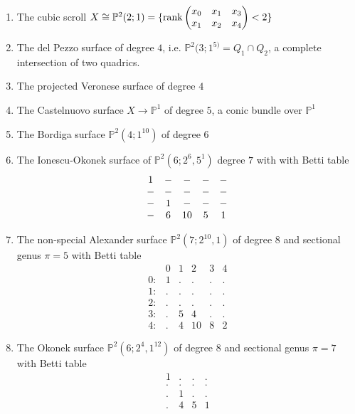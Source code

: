 \documentclass[twoside,12pt, leqno]{amsart}
\def\PP{{\mathbb P}}
\DeclareMathOperator{\rank}{{rank}}
\begin{document}
\begin{enumerate}
\item The cubic scroll $X\cong \PP^{2}(2;1) =\{\rank \begin{pmatrix} x_{0}& x_{1}&x_{3} \cr x_{1}& x_{2}& x_{4}\end{pmatrix} <2\} $

\item The del Pezzo surface of degree $4$, i.e. $\PP^{2}(3;1^{5)} = Q_{1}\cap Q_{2}$, a complete intersection of two quadrics.

\item The projected Veronese surface of degree $4$

\item The Castelnuovo surface $X \to \PP^{1}$ of degree $5$, a conic bundle over $\PP^{1}$

\item The Bordiga surface $\PP^{2}(4;1^{10})$ of degree $6$

\item The Ionescu-Okonek surface of $\PP^{2}(6;2^{6},5^{1})$ degree $7$ with with Betti table 
$$\begin{matrix}1 &- & -&-& -\cr 
                          - & - & - &- &-\cr 
                         - & 1& - &- &-\cr
                          - & 6 & 10& 5& 1 \cr \end{matrix}$$

\item The non-special Alexander surface $\PP^{2}(7;2^{10},1)$ of degree $8$ and sectional genus $\pi=5$ with Betti table
$$\begin{matrix}
      & 0 & 1 & 2 & 3 & 4\\
     0: & 1 & . & . & . & .\\
     1: & . & . & . & . & .\\
     2: & . & . & . & . & .\\
     3: & . & 5 & 4 & . & .\\
     4: & . & 4 & 10 & 8 & 2
     \end{matrix}$$

\item The Okonek surface $\PP^{2}(6;2^{4},1^{12})$ of degree $8$ and  sectional genus $\pi=7$ with Betti table
$$\begin{matrix}
         1 & . & . & .\\
        . & . & . & .\\
        . & 1 & . & .\\
        . & 4 & 5 & 1
      \end{matrix}$$




\end{enumerate}
\end{document}
